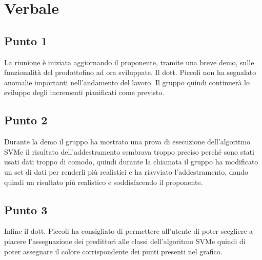 \section{Verbale}
        \subsection{Punto 1}
            La riunione è iniziata aggiornando il proponente, tramite una breve demo, sulle funzionalità del prodotto\glosp fino ad ora sviluppate. Il dott. Piccoli non ha segnalato anomalie importanti nell'andamento del lavoro. Il gruppo quindi continuerà lo sviluppo degli incrementi pianificati come previsto.
        \subsection{Punto 2}
            Durante la demo il gruppo ha mostrato una prova di esecuzione dell'algoritmo SVM\glosp e il risultato dell'addestramento sembrava troppo preciso perché sono stati usati dati troppo di comodo, quindi durante la chiamata il gruppo ha modificato un set di dati per renderli più realistici e ha riavviato l'addestramento, dando quindi un risultato più realistico e soddisfacendo il proponente.
        \subsection{Punto 3}
            Infine il dott. Piccoli ha consigliato di permettere all'utente di poter scegliere a piacere l'assegnazione dei predittori alle classi dell'algoritmo SVM\glosp e quindi di poter assegnare il colore corrispondente dei punti presenti nel grafico.
